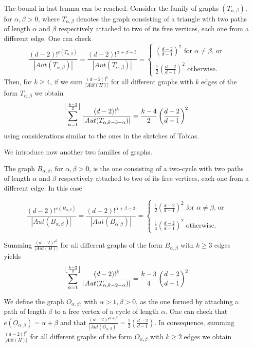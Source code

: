 \documentclass[11pt,notitlepage,a4paper]{article}
\theoremstyle{definition}
\DeclarePairedDelimiter\floor{\lfloor}{\rfloor}
\begin{document}
The bound in last lemma can be reached. Consider the 
family of graphs $(T_{\alpha,\beta})$, for $\alpha,\beta>0$,
where $T_{\alpha,\beta}$ denotes the graph consisting of
a triangle with two paths of length $\alpha$ and $\beta$ 
respectively attached to two of its free vertices, 
each one from a different edge. One can check
\[
\frac{(d-2)!^{e(T_{\alpha,\beta})}}{|Aut(T_{\alpha,\beta})|}=
\frac{(d-2)!^{\alpha+\beta+3}}{|Aut(T_{\alpha,\beta})|}=\begin{cases}
\left(\frac{d-2}{d-1}\right)^2 \text{ for } \alpha\neq\beta \text{,   or}\\
\\
\frac{1}{2}\left(\frac{d-2}{d-1}\right)^2\text{ otherwise.} 
\end{cases}
\]
Then, for $k\geq 4$, if we sum $\frac{(d-2)!^{k}}
{|Aut(H)|}$ for all different graphs with $k$ edges
of the form $T_{\alpha,\beta}$ we obtain 
\begin{equation} \label{eqn:triangles}
 \sum_{\alpha=1}^{\floor*{\frac{k-3}{2}}}
\frac{(d-2)!^{k}}{|Aut(T_{\alpha,k-3-\alpha})|}= 
\frac{k-4}{2} \left( \frac{d-2}{d-1} \right)^2
\end{equation}
using considerations similar to the ones
in the sketches of Tobias. \par

We introduce now another two families of graphs. \par

The graph $B_{\alpha,\beta}$, for $\alpha,\beta>0$, is
the one consisting of a two-cycle with two paths 
of length $\alpha$ and $\beta$ 
respectively attached to two of its free vertices, 
each one from a different edge. In this case

\[
\frac{(d-2)!^{e(B_{\alpha,\beta})}}{|Aut(B_{\alpha,\beta})|}=
\frac{(d-2)!^{\alpha+\beta+2}}{|Aut(B_{\alpha,\beta})|}=
\begin{cases}
\frac{1}{2}\left(\frac{d-2}{d-1}\right)^2 
\text{ for } \alpha\neq\beta \text{,   or}\\
\\
\frac{1}{4}\left(\frac{d-2}{d-1}\right)^2\text{ otherwise.} 
\end{cases}
\]

Summing $\frac{(d-2)!^{k}}{|Aut(H)|}$ for all different
graphs of the form $B_{\alpha,\beta}$ with $k\geq 3$ edges
yields
\begin{equation}  \label{eqn:twocycles}
\sum_{\alpha=1}^{\floor*{\frac{k-2}{2}}}
\frac{(d-2)!^{k}}{|Aut(T_{\alpha,k-2-\alpha})|}= 
\frac{k-3}{4}\left( \frac{d-2}{d-1} \right)^2
\end{equation}
\par
We define the graph $O_{\alpha,\beta}$,
with $\alpha>1, \beta>0$, as the one
formed by attaching a path of length
$\beta$ to a free vertex of a cycle of
length $\alpha$. One can check that 
$e(O_{\alpha,\beta})=\alpha+\beta$ and
that $\frac{(d-2)!^{\alpha+\beta}}
{|Aut(O_{\alpha,\beta})|}=
\frac{1}{2}\left(\frac{d-2}{d-1}\right)$.
In consequence, summing $\frac{(d-2)!^{k}}{|Aut(H)|}$
for all different graphs of the form $O_{\alpha,\beta}$ 
with $k\geq 2$ edges we obtain
\end{document}

